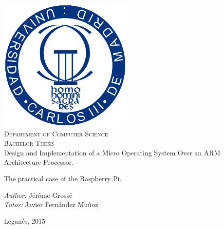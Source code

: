 \pagestyle{empty}
\begin{titlepage}
\begin{center}


\includegraphics[width=0.5\textwidth]{includes/figures/uc3m_logo.png}  \\[0.5 cm]

\large \textsc{Department of Computer Science} \\ [1 cm]

\huge \textsc{Bachelor Thesis}\\[1 cm]

\huge Design and Implementation of a Micro Operating System Over an ARM Architecture Processor.

The practical case of the Raspberry Pi.\\[3 cm]

\begin{flushleft} \Large
\emph{Author:} Jérôme Grossé\\
\emph{Tutor:} Javier Fernández Muñoz
\end{flushleft}

\vfill

{\large Leganés, 2015}

\end{center}
\end{titlepage}
